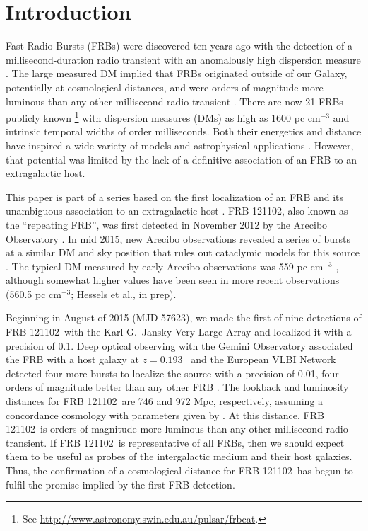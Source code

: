 \documentclass[twocolumn]{aastex61}
\newcommand{\frb}{FRB 121102}
\begin{document}
\section{Introduction}

Fast Radio Bursts (FRBs) were discovered ten years ago with the detection of a millisecond-duration radio transient with an anomalously high dispersion measure \citep{2007Sci...318..777L}. The large measured DM implied that FRBs originated outside of our Galaxy, potentially at cosmological distances, and were orders of magnitude more luminous than any other millisecond radio transient \citep{2013Sci...341...53T}. There are now 21 FRBs publicly known \footnote{See \url{http://www.astronomy.swin.edu.au/pulsar/frbcat}.} with dispersion measures (DMs) as high as 1600 pc cm$^{-3}$ and intrinsic temporal widths of order milliseconds. Both their energetics and distance have inspired a wide variety of models and astrophysical applications \citep[e.g.,][]{2014ApJ...780L..33M, 2014ApJ...797...70K, 2015MNRAS.450L..71F, 2016MNRAS.458L..19C, 2016MNRAS.457..232C, 2016MNRAS.462L..16P}. However, that potential was limited by the lack of a definitive association of an FRB to an extragalactic host.

This paper is part of a series based on the first localization of an FRB and its unambiguous association to an extragalactic host \citep{LOC, OPT, EVN}. \frb, also known as the ``repeating FRB'', was first detected in November 2012 by the Arecibo Observatory \citep{2014ApJ...790..101S}. In mid 2015, new Arecibo observations revealed a series of bursts at a similar DM and sky position that rules out 
cataclymic models for this source \citep{2016Natur.531..202S}. The typical DM measured by early Arecibo observations was 559 pc cm$^{-3}$ \citep{2016arXiv160308880S}, although somewhat higher values have been seen in more recent observations (560.5 pc cm$^{-3}$; Hessels et al., in prep).

Beginning in August of 2015 (MJD 57623), we made the first of nine detections of \frb\ with the Karl G.\ Jansky Very Large Array \citep[VLA;][]{LOC} and localized it with a precision of 0.1\arcsec. Deep optical observing with the Gemini Observatory associated the FRB with a host galaxy at $z=0.193$\ \citep{OPT} and the European VLBI Network detected four more bursts to localize the source with a precision of 0.01\arcsec, four orders of magnitude better than any other FRB \citep[precision of $\sim40$\ pc in linear distance;][]{EVN}. The lookback and luminosity distances for \frb\ are 746 and 972 Mpc, respectively, assuming a concordance cosmology with parameters given by \citet{2016A&A...594A..13P}. At this distance, \frb\ is orders of magnitude more luminous than any other millisecond radio transient. If \frb\ is representative of all FRBs, then we should expect them to be useful as probes of the intergalactic medium and their host galaxies. Thus, the confirmation of a cosmological distance for \frb\ has begun to fulfil the promise implied by the first FRB detection.
\end{document}
